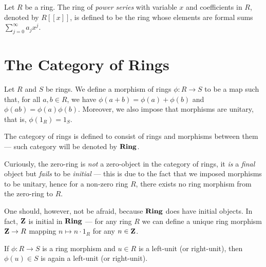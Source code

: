 %
\begin{definition}
\label{def:power-series-ring}
Let \(R\) be a ring. The ring of \emph{power series} with variable \(x\) and
coefficients in \(R\), denoted by \(R[\![x]\!]\), is defined to be the ring
whose elements are formal sums \(\sum_{j=0}^{\infty} a_j x^j\).
\end{definition}
%

\section{The Category of Rings}

%
\begin{definition}
\label{def:ring-morphism}
Let \(R\) and \(S\) be rings. We define a morphism of rings \(\phi: R \to S\) to
be a map such that, for all \(a, b \in R\), we have \(\phi(a + b) = \phi(a) +
\phi(b)\) and \(\phi(a b) = \phi(a) \phi(b)\). Moreover, we also impose that
morphisms are unitary, that is, \(\phi(1_R) = 1_S\).
\end{definition}
%

%
\begin{definition}
\label{def:ring-category}
The category of rings is defined to consist of rings and morphisms between them
--- such category will be denoted by \({\textbf{Ring}}\).
\end{definition}
%

%
\begin{remark}
\label{rem:zero-ring-not-zero-object-in-Ring}
Curiously, the zero-ring is \emph{not} a zero-object in the category of rings,
it \emph{is} a \emph{final} object but \emph{fails} to be \emph{initial} ---
this is due to the fact that we imposed morphisms to be unitary, hence for a
non-zero ring \(R\), there exists no ring morphism from the zero-ring to \(R\).

One should, however, not be afraid, because \({\textbf{Ring}}\) does have initial objects.
In fact, \(\mathbf{Z}\) is initial in \({\textbf{Ring}}\) --- for any ring \(R\) we can
define a unique ring morphism \(\mathbf{Z} \to R\) mapping \(n \mapsto n \cdot 1_R\)
for any \(n \in \mathbf{Z}\).
\end{remark}
%

%
\begin{corollary}
\label{cor:ring-morphisms-preserve-units}
If \(\phi: R \to S\) is a ring morphism and \(u \in R\) is a left-unit (or
right-unit), then \(\phi(u) \in S\) is again a left-unit (or right-unit).
\end{corollary}
%

